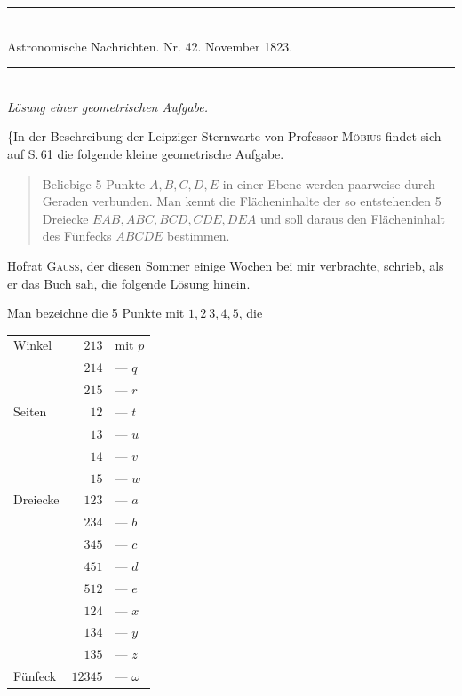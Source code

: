 \clearpage
{}%
\begin{center}
\rule{.8\textwidth}{.4pt}\\[4pt]
Astronomische Nachrichten. Nr. 42. November 1823.\\[4pt]
\rule{.8\textwidth}{.4pt}\\[12pt]
\textit{Lösung einer geometrischen Aufgabe.}
\end{center}
\hspace*{\parindent}\{In der Beschreibung der Leipziger Sternwarte von Professor \textsc{Möbius} findet sich auf S.\,61 die folgende kleine geometrische Aufgabe.
\begin{quote}
Beliebige 5 Punkte \(A,B,C,D,E\) in einer Ebene werden paarweise durch Geraden verbunden. Man kennt die Flächeninhalte der so entstehenden 5 Dreiecke \(EAB,ABC,BCD,CDE,DEA\) und soll daraus den Flächeninhalt des Fünfecks \(ABCDE\) bestimmen.
\end{quote}
Hofrat \textsc{Gauss}, der diesen Sommer einige Wochen bei mir verbrachte, schrieb, als er das Buch sah, die folgende Lösung hinein.

Man bezeichne die 5 Punkte mit \(1,2\ 3,4,5\), die
\begin{center}
\begin{tabular}{lrl}
Winkel&\(213\)&mit \(p\)\\
&\(214\)&— \(q\)\\
&\(215\)&— \(r\)\\\hline
Seiten&\(12\)&— \(t\)\\
&\(13\)&— \(u\)\\
&\(14\)&— \(v\)\\
&\(15\)&— \(w\)\\\hline
Dreiecke&\(123\)&— \(a\)\\
&\(234\)&— \(b\)\\
&\(345\)&— \(c\)\\
&\(451\)&— \(d\)\\
&\(512\)&— \(e\)\\
&\(124\)&— \(x\)\\
&\(134\)&— \(y\)\\
&\(135\)&— \(z\)\\\hline
Fünfeck&\(12345\)&— \(\omega\)
\end{tabular}
\end{center}
